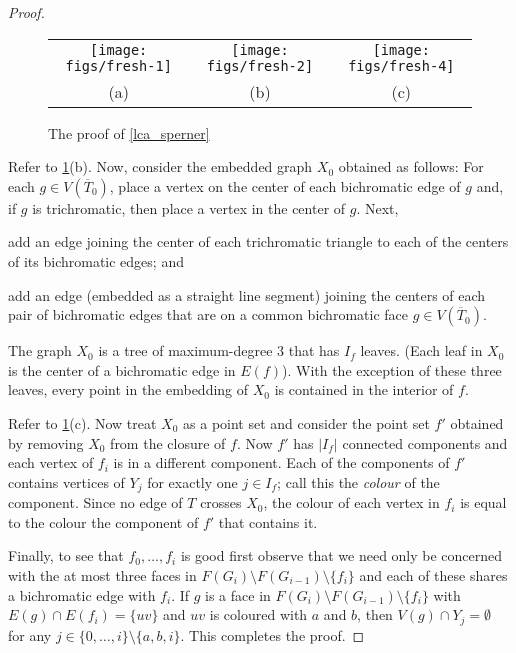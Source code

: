 \documentclass[a4paper,UKenglish,autoref]{lipics-v2021}
\begin{document}
\begin{proof}
  \begin{figure}
    \begin{center}
      \begin{tabular}{ccc}
        \texttt{[image: figs/fresh-1]} &
        \texttt{[image: figs/fresh-2]} &
        \texttt{[image: figs/fresh-4]} \\
        (a) & (b) & (c)
      \end{tabular}
    \end{center}
    \caption{The proof of \cref{lca_sperner}}
    \label{lca_sperner_fig}
  \end{figure}

  Refer to \cref{lca_sperner_fig}(b).
  Now, consider the embedded graph $X_0$ obtained as follows: For each $g\in V(\overline{T}_0)$, place a vertex on the center of each bichromatic edge of $g$ and, if $g$ is trichromatic, then place a vertex in the center of $g$.  Next,
   \begin{compactenum}
    \item add an edge joining the center of each trichromatic triangle to each of the centers of its bichromatic edges; and
    \item add an edge (embedded as a straight line segment) joining the centers of each pair of bichromatic edges that are on a common bichromatic face $g\in V(\overline{T}_0)$.
  \end{compactenum}
  The graph $X_0$ is a tree of maximum-degree $3$ that has $I_f$ leaves.  (Each leaf in $X_0$ is the center of a bichromatic edge in $E(f)$).  With the exception of these three leaves, every point in the embedding of $X_0$ is contained in the interior of $f$.

  Refer to \cref{lca_sperner_fig}(c).
  Now treat $X_0$ as a point set and consider the point set $f'$ obtained by removing $X_0$ from the closure of $f$. Now $f'$ has $|I_f|$ connected components and each vertex of $f_i$ is in a different component.  Each of the components of $f'$ contains vertices of $Y_j$ for exactly one $j\in I_f$; call this the \emph{colour} of the component.  Since no edge of $T$ crosses $X_0$, the colour of each vertex in $f_i$ is equal to the colour the component of $f'$ that contains it.

  Finally, to see that $f_0,\ldots,f_i$ is good first observe that we need only be concerned with the at most three faces in $F(G_i)\setminus F(G_{i-1})\setminus\{f_i\}$ and each of these shares a bichromatic edge with $f_i$.  If $g$ is a face in $F(G_i)\setminus F(G_{i-1})\setminus\{f_i\}$ with $E(g) \cap E(f_i) = \{uv\}$ and $uv$ is coloured with $a$ and $b$, then $V(g)\cap Y_j=\emptyset$ for any $j\in\{0,\ldots,i\}\setminus\{a, b, i\}$.  This completes the proof.

\end{proof}
\end{document}
